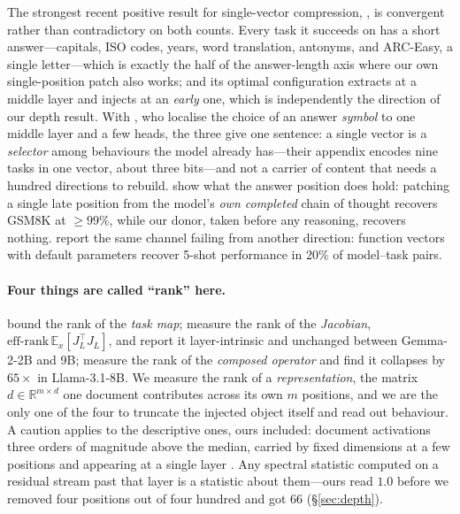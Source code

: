 \documentclass{article}
\newcommand{\dvec}{\ensuremath{d}}
\begin{document}
The strongest recent positive result for single-vector compression,
\citet{ardoin2026promptcompression}, is convergent rather than contradictory on
both counts. Every task it succeeds on has a short answer---capitals, ISO codes,
years, word translation, antonyms, and ARC-Easy, a single letter---which is
exactly the half of the answer-length axis where our own single-position patch
also works; and its optimal configuration extracts at a middle layer and injects
at an \emph{early} one, which is independently the direction of our depth
result. With \citet{wiegreffe2025mcq}, who localise the choice of an answer
\emph{symbol} to one middle layer and a few heads, the three give one sentence:
a single vector is a \emph{selector} among behaviours the model already
has---their appendix encodes nine tasks in one vector, about three bits---and
not a carrier of content that needs a hundred directions to rebuild.
\citet{mehrafarin2026cothidden} show what the answer position does hold:
patching a single late position from the model's \emph{own completed} chain of
thought recovers GSM8K at $\ge99\%$, while our donor, taken before any
reasoning, recovers nothing. \citet{dasilva2025steeringoff} report the same
channel failing from another direction: function vectors with default
parameters recover 5-shot performance in $20\%$ of model--task pairs.

\paragraph{Four things are called ``rank'' here.}
\citet{dong2026taskvectorlimits} bound the rank of the \emph{task map};
\citet{sarkar2026causaldim} measure the rank of the \emph{Jacobian},
$\mathrm{eff\text{-}rank}\,\mathbb{E}_x[J_L^\top J_L]$, and report it
layer-intrinsic and unchanged between Gemma-2-2B and 9B;
\citet{fernando2026residualspectral} measure the rank of the \emph{composed
operator} and find it collapses by $65\times$ in Llama-3.1-8B. We measure the
rank of a \emph{representation}, the matrix $\dvec\in\mathbb{R}^{m\times d}$ one
document contributes across its own $m$ positions, and we are the only one of
the four to truncate the injected object itself and read out behaviour. A
caution applies to the descriptive ones, ours included:
\citet{sun2024massive} document activations three orders of magnitude above the
median, carried by fixed dimensions at a few positions and appearing at a single
layer \citep{shi2026melayer}. Any spectral statistic computed on a residual
stream past that layer is a statistic about them---ours read $1.0$ before we
removed four positions out of four hundred and got $66$ (\S\ref{sec:depth}).
\end{document}
